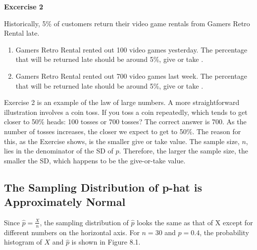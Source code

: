\documentclass[11pt, chapterprefix=true]{scrbook}\usepackage[]{graphicx}\usepackage[]{color}
\begin{document}
\begin{minipage}[ht]{3cm}

\vspace{-45mm}

\textbf{Excercise 2}
\end{minipage}
\begin{minipage}[ht]{11cm}

\parbox{11cm}{
Historically, 5\% of customers return their video game rentals from Gamers Retro Rental late.

\begin{enumerate}
\item Gamers Retro Rental rented out 100 video games yesterday.  The percentage that will be returned late should be around 5\%, give or take \underline{\phantom{xxxxxxx}}.
\item Gamers Retro Rental rented out 700 video games last week.  The percentage that will be returned late should be around 5\%, give or take \underline{\phantom{xxxxxxx}}.
\end{enumerate}
}
\end{minipage}

Exercise 2 is an example of the law of large numbers.  A more straightforward illustration involves a coin toss.  If you toss a coin repeatedly, which tends to get closer to 50\% heads: 100 tosses or 700 tosses?  The correct answer is 700.  As the number of tosses increases, the closer we expect to get to 50\%.  The reason for this, as the Exercise shows, is the smaller give or take value.  The sample size, $n$, lies in the denominator of the SD of $\hat{p}$.  Therefore, the larger the sample size, the smaller the SD, which happens to be the give-or-take value.


\subsection{The Sampling Distribution of p-hat is Approximately Normal}

Since $\hat{p} = \frac{X}{n}$, the sampling distribution of $\hat{p}$ looks the same as that of X except for different numbers on the horizontal axis.  For $n = 30$ and $p = 0.4$, the probability histogram of $X$ and $\hat{p}$ is shown in Figure 8.1.
\end{document}
